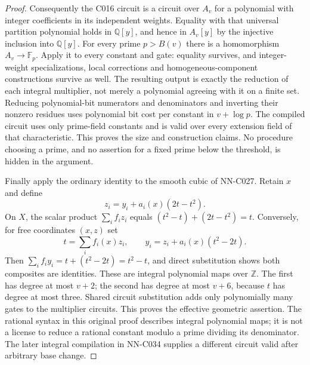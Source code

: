 \begin{proof}
Consequently the C016 circuit is a circuit over $A_v$ for a polynomial with integer coefficients in its independent weights. Equality with that universal partition polynomial holds in $\mathbb Q[y]$, and hence in $A_v[y]$ by the injective inclusion into $\mathbb Q[y]$. For every prime $p>B(v)$ there is a homomorphism $A_v\to\mathbb F_p$. Apply it to every constant and gate: equality survives, and integer-weight specializations, local corrections and homogeneous-component constructions survive as well. The resulting output is exactly the reduction of each integral multiplier, not merely a polynomial agreeing with it on a finite set. Reducing polynomial-bit numerators and denominators and inverting their nonzero residues uses polynomial bit cost per constant in $v+\log p$. The compiled circuit uses only prime-field constants and is valid over every extension field of that characteristic. This proves the size and construction claims. No procedure choosing a prime, and no assertion for a fixed prime below the threshold, is hidden in the argument.

Finally apply the ordinary identity to the smooth cubic of NN-C027. Retain $x$ and define
\[
 z_i=y_i+a_i(x)(2t-t^2).
\]
On $X$, the scalar product $\sum_i f_i z_i$ equals
$(t^2-t)+(2t-t^2)=t$. Conversely, for free coordinates $(x,z)$ set
\[
 t=\sum_i f_i(x)z_i,
 \qquad y_i=z_i+a_i(x)(t^2-2t).
\]
Then $\sum_i f_i y_i=t+(t^2-2t)=t^2-t$, and direct substitution shows both composites are identities. These are integral polynomial maps over $\mathbb Z$. The first has degree at most $v+2$; the second has degree at most $v+6$, because $t$ has degree at most three. Shared circuit substitution adds only polynomially many gates to the multiplier circuits. This proves the effective geometric assertion. The rational syntax in this original proof describes integral polynomial maps; it is not a license to reduce a rational constant modulo a prime dividing its denominator. The later integral compilation in NN-C034 supplies a different circuit valid after arbitrary base change.
\end{proof}
